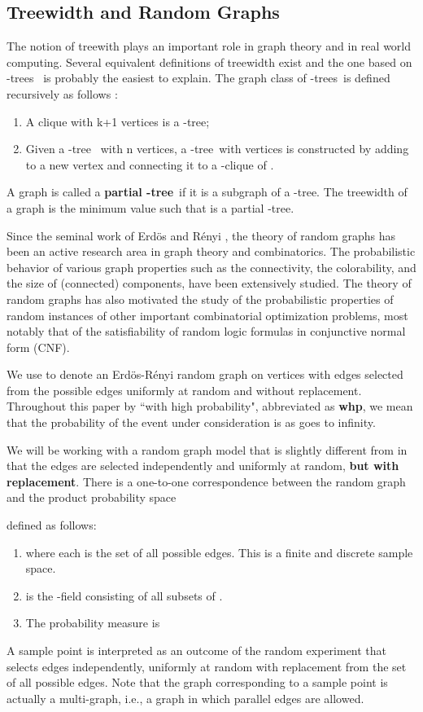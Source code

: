 \documentclass[11pt]{article}
\providecommand{\whp}{\textbf{whp}}
\providecommand{\ktree}{-tree}
\providecommand{\ktrees}{-trees}
\begin{document}
\subsection{Treewidth and Random Graphs}
\label{subsec-treewidth}
The notion of treewith plays an important role in graph theory and in real world computing.   
Several equivalent definitions of treewidth exist and the one based on \ktrees~ is probably 
the easiest to explain. The graph class of \ktrees~is defined recursively as follows
\cite{kloks94}:
\begin{enumerate}
    \item A clique with k+1 vertices is a \ktree;
    \item Given a \ktree~  with n vertices, a \ktree~with
         vertices is constructed by adding to  a new
        vertex and connecting it to a -clique of .
\end{enumerate}
A graph is called a \textbf{partial \ktree}~if it is a subgraph of a
\ktree. The treewidth  of a graph  is the minimum value  such that
 is a partial \ktree.

Since the seminal work of Erd\"{o}s and R\'{e}nyi 
\cite{erdos60}, the theory of random graphs  has been an active research area in  graph theory and combinatorics. The probabilistic behavior of various graph properties such as the connectivity, the colorability, and the size of (connected) components, have been extensively 
studied. The theory of random graphs has also motivated the study 
of the probabilistic properties of random instances of other important combinatorial 
optimization problems, most notably that of the satisfiability of random logic formulas in
conjunctive normal form (CNF).    

We use  to denote an Erd\"{o}s-R\'{e}nyi random graph \cite{bollobas01} on 
 vertices with  edges selected from the  possible edges 
uniformly at random and without replacement.  Throughout this paper by ``with high probability",
abbreviated as \whp,  we mean that the probability of the event under consideration
is  as  goes to infinity.   

We will be working with a random graph model  that is slightly different
from  in that the  edges are selected independently and uniformly
at random, \textbf{but with replacement}. 
There is a one-to-one correspondence between the random graph  and the 
product probability space 

defined as follows:
\begin{enumerate} 
\item  where each 
 is the set of all  possible edges. This is a finite and discrete  sample space.
\item  is the -field consisting of all subsets of .  
\item The probability measure   is 

\end{enumerate}
A sample point  is interpreted as an outcome of the 
random experiment that selects  edges independently, uniformly at random with replacement
from the set of all possible edges. Note that the graph corresponding to a sample point   is actually a multi-graph, i.e., a graph in which parallel edges are allowed.    
\end{document}
